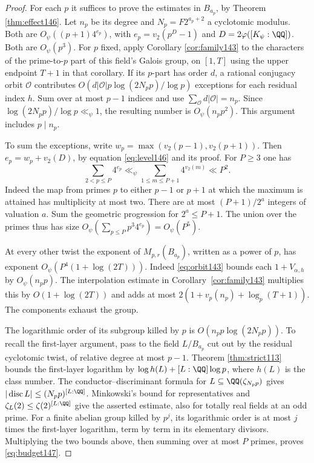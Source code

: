 \documentclass[a4paper,11pt]{article}
\theoremstyle{definition}
\theoremstyle{remark}
\numberwithin{equation}{section}
\begin{document}
\begin{proof}
For each \(p\) it suffices to prove the estimates in
\(B_{a_p}\), by Theorem \ref{thm:effect146}. Let \(n_p\) be its degree
and \(N_p=F2^{a_p+2}\) a cyclotomic modulus. Both are
\(O_\psi((p+1)4^{e_p})\), with \(e_p=v_2(p^D-1)\) and
\(D=2\varphi([K_\psi:\QQ])\). Both are \(O_\psi(p^3)\).
For \(p\) fixed, apply Corollary \ref{cor:family143} to the
characters of the prime-to-\(p\) part of this field's Galois
group, on \([1,T]\) using the upper endpoint \(T+1\) in that
corollary. If its \(p\)-part has order \(d\), a rational
conjugacy orbit \(\mathcal O\) contributes
\(O(d|\mathcal O|p\log(2N_pp)/\log p)\) exceptions for each
residual index \(h\). Sum over at most \(p-1\) indices and use
\(\sum_{\mathcal O}d|\mathcal O|=n_p\). Since
\(\log(2N_pp)/\log p\ll_\psi1\), the resulting number is
\(O_\psi(n_p p^2)\). This argument includes \(p\mid n_p\).

To sum the exceptions, write \(w_p=\max(v_2(p-1),v_2(p+1))\).
Then \(e_p=w_p+v_2(D)\), by equation \ref{eq:level146} and its proof.
For \(P\ge3\) one has
\[
  \sum_{2<p\le P}4^{e_p}\ll_\psi
       \sum_{1\le m\le P+1}4^{v_2(m)}\ll P^2 .
\]
Indeed the map from primes \(p\) to either \(p-1\) or \(p+1\)
at which the maximum is attained has multiplicity at most two.
There are at most \((P+1)/2^a\) integers of valuation \(a\).
Sum the geometric progression for \(2^a\le P+1\). The union
over the primes thus has size
\(O_\psi(\sum_{p\le P}p^3 4^{e_p})=O_\psi(P^5)\).

At every other twist the exponent of \(M_{p,r}(B_{a_p})\),
written as a power of \(p\), has exponent
\(O_\psi(P^4(1+\log(2T)))\). Indeed \eqref{eq:orbit143}
bounds each \(1+V_{\alpha,h}\) by \(O_\psi(n_p p)\).
The interpolation estimate in Corollary~\ref{cor:family143} multiplies this
by \(O(1+\log(2T))\) and adds at most
\(2(1+v_p(n_p)+\log_p(T+1))\). The components exhaust the group.

The logarithmic order of its subgroup killed by \(p\) is
\(O(n_p p\log(2N_pp))\). To recall the first-layer argument,
pass to the field \(L/B_{a_p}\) cut out by the residual
cyclotomic twist, of relative degree at most \(p-1\).
Theorem \ref{thm:strict113} bounds the first-layer logarithm by
\(\log h(L)+[L:\QQ]\log p\), where \(h(L)\) is the class
number. The conductor--discriminant formula for
\(L\subseteq\QQ(\zeta_{N_pp})\) gives
\(|\operatorname{disc}L|\le (N_pp)^{[L:\QQ]}\). Minkowski's
bound for representatives and
\(\zeta_L(2)\le\zeta(2)^{[L:\QQ]}\) give the asserted estimate,
also for totally real fields at an odd prime. For a finite
abelian group killed by \(p^j\), its logarithmic order is at
most \(j\) times the first-layer logarithm, term by term in
its elementary divisors. Multiplying the two bounds above,
then summing over at most \(P\) primes, proves \eqref{eq:budget147}.
\end{proof}
\end{document}
